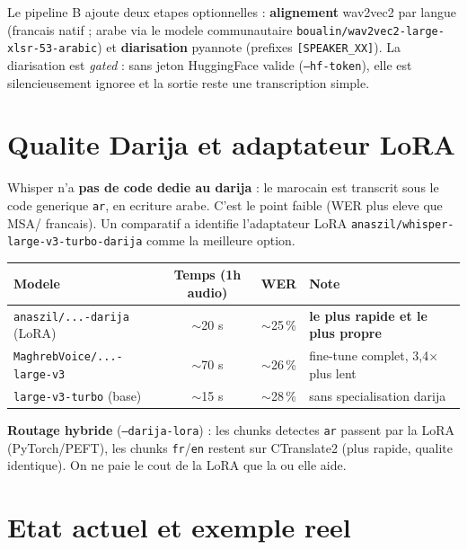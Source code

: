 \documentclass[11pt, a4paper]{article}
\begin{document}
Le pipeline B ajoute deux etapes optionnelles : \textbf{alignement} wav2vec2 par langue
(francais natif ; arabe via le modele communautaire \texttt{boualin/wav2vec2-large-xlsr-53-arabic})
et \textbf{diarisation} pyannote (prefixes \texttt{[SPEAKER\_XX]}). La diarisation est
\emph{gated} : sans jeton HuggingFace valide (\texttt{--hf-token}), elle est silencieusement
ignoree et la sortie reste une transcription simple.

\section{Qualite Darija et adaptateur LoRA}

Whisper n'a \textbf{pas de code dedie au darija} : le marocain est transcrit sous le code
generique \texttt{ar}, en ecriture arabe. C'est le point faible (WER plus eleve que MSA/
francais). Un comparatif a identifie l'adaptateur LoRA \texttt{anaszil/whisper-large-v3-turbo-darija}
comme la meilleure option.

\begin{center}
\small
\begin{tabular}{lccl}
\toprule
\textbf{Modele} & \textbf{Temps (1h audio)} & \textbf{WER} & \textbf{Note} \\
\midrule
\texttt{anaszil/...-darija} (LoRA) & $\sim$20 s & $\sim$25\,\% & \textbf{le plus rapide et le plus propre} \\
\texttt{MaghrebVoice/...-large-v3} & $\sim$70 s & $\sim$26\,\% & fine-tune complet, 3,4$\times$ plus lent \\
\texttt{large-v3-turbo} (base) & $\sim$15 s & $\sim$28\,\% & sans specialisation darija \\
\bottomrule
\end{tabular}
\end{center}

\textbf{Routage hybride} (\texttt{--darija-lora}) : les chunks detectes \texttt{ar}
passent par la LoRA (PyTorch/PEFT), les chunks \texttt{fr}/\texttt{en} restent sur
CTranslate2 (plus rapide, qualite identique). On ne paie le cout de la LoRA que la ou
elle aide.

\section{Etat actuel et exemple reel}
\end{document}
